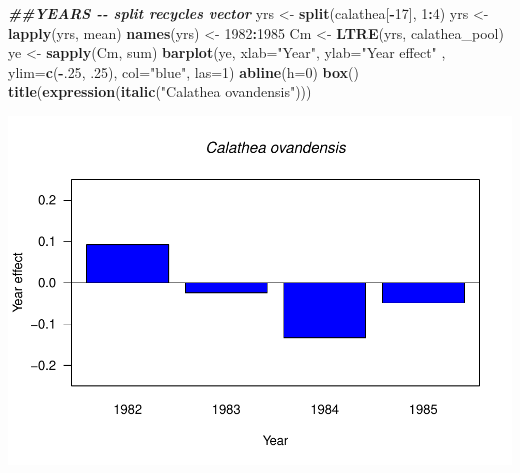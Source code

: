 \documentclass[
]{book}
\newenvironment{Shaded}{\begin{snugshade}}{\end{snugshade}}
\newcommand{\AttributeTok}[1]{\textcolor[rgb]{0.13,0.29,0.53}{#1}}
\newcommand{\DecValTok}[1]{\textcolor[rgb]{0.00,0.00,0.81}{#1}}
\newcommand{\DocumentationTok}[1]{\textcolor[rgb]{0.56,0.35,0.01}{\textbf{\textit{#1}}}}
\newcommand{\FunctionTok}[1]{\textcolor[rgb]{0.13,0.29,0.53}{\textbf{#1}}}
\newcommand{\NormalTok}[1]{#1}
\newcommand{\OtherTok}[1]{\textcolor[rgb]{0.56,0.35,0.01}{#1}}
\newcommand{\SpecialCharTok}[1]{\textcolor[rgb]{0.81,0.36,0.00}{\textbf{#1}}}
\newcommand{\StringTok}[1]{\textcolor[rgb]{0.31,0.60,0.02}{#1}}
\theoremstyle{definition}
\theoremstyle{definition}
\theoremstyle{definition}
\theoremstyle{definition}
\theoremstyle{remark}
\begin{document}
\begin{Shaded}
\begin{Highlighting}[]
\DocumentationTok{\#\#YEARS {-}{-} split recycles vector}
\NormalTok{yrs }\OtherTok{\textless{}{-}} \FunctionTok{split}\NormalTok{(calathea[}\SpecialCharTok{{-}}\DecValTok{17}\NormalTok{], }\DecValTok{1}\SpecialCharTok{:}\DecValTok{4}\NormalTok{)}
\NormalTok{yrs }\OtherTok{\textless{}{-}} \FunctionTok{lapply}\NormalTok{(yrs, mean)}
\FunctionTok{names}\NormalTok{(yrs) }\OtherTok{\textless{}{-}} \DecValTok{1982}\SpecialCharTok{:}\DecValTok{1985}
\NormalTok{Cm }\OtherTok{\textless{}{-}} \FunctionTok{LTRE}\NormalTok{(yrs, calathea\_pool)}
\NormalTok{ye }\OtherTok{\textless{}{-}} \FunctionTok{sapply}\NormalTok{(Cm, sum)}
\FunctionTok{barplot}\NormalTok{(ye, }\AttributeTok{xlab=}\StringTok{"Year"}\NormalTok{, }\AttributeTok{ylab=}\StringTok{"Year effect"}\NormalTok{ , }\AttributeTok{ylim=}\FunctionTok{c}\NormalTok{(}\SpecialCharTok{{-}}\NormalTok{.}\DecValTok{25}\NormalTok{, .}\DecValTok{25}\NormalTok{), }\AttributeTok{col=}\StringTok{"blue"}\NormalTok{, }\AttributeTok{las=}\DecValTok{1}\NormalTok{)}
\FunctionTok{abline}\NormalTok{(}\AttributeTok{h=}\DecValTok{0}\NormalTok{)}
\FunctionTok{box}\NormalTok{()}
\FunctionTok{title}\NormalTok{(}\FunctionTok{expression}\NormalTok{(}\FunctionTok{italic}\NormalTok{(}\StringTok{"Calathea ovandensis"}\NormalTok{)))}
\end{Highlighting}
\end{Shaded}

\includegraphics{Diagnostico_Poblacional_files/figure-latex/unnamed-chunk-24-2.pdf}
\end{document}
